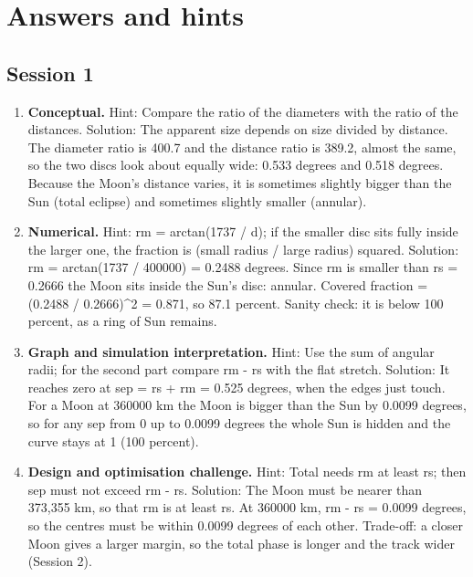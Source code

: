 \documentclass[11pt,a4paper]{article}
\begin{document}
\section{Answers and hints}

\subsection*{Session 1}
\begin{enumerate}[nosep]
\item \textbf{Conceptual.} Hint: Compare the ratio of the diameters with the ratio of the distances. Solution: The apparent size depends on size divided by distance. The diameter ratio is 400.7 and the distance ratio is 389.2, almost the same, so the two discs look about equally wide: 0.533 degrees and 0.518 degrees. Because the Moon's distance varies, it is sometimes slightly bigger than the Sun (total eclipse) and sometimes slightly smaller (annular).
\item \textbf{Numerical.} Hint: rm = arctan(1737 / d); if the smaller disc sits fully inside the larger one, the fraction is (small radius / large radius) squared. Solution: rm = arctan(1737 / 400000) = 0.2488 degrees. Since rm is smaller than rs = 0.2666 the Moon sits inside the Sun's disc: annular. Covered fraction = (0.2488 / 0.2666)\textasciicircum{}2 = 0.871, so 87.1 percent. Sanity check: it is below 100 percent, as a ring of Sun remains.
\item \textbf{Graph and simulation interpretation.} Hint: Use the sum of angular radii; for the second part compare rm - rs with the flat stretch. Solution: It reaches zero at sep = rs + rm = 0.525 degrees, when the edges just touch. For a Moon at 360000 km the Moon is bigger than the Sun by 0.0099 degrees, so for any sep from 0 up to 0.0099 degrees the whole Sun is hidden and the curve stays at 1 (100 percent).
\item \textbf{Design and optimisation challenge.} Hint: Total needs rm at least rs; then sep must not exceed rm - rs. Solution: The Moon must be nearer than 373,355 km, so that rm is at least rs. At 360000 km, rm - rs = 0.0099 degrees, so the centres must be within 0.0099 degrees of each other. Trade-off: a closer Moon gives a larger margin, so the total phase is longer and the track wider (Session 2).
\end{enumerate}
\end{document}
